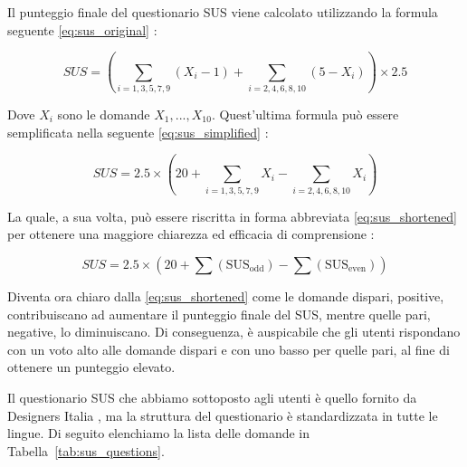 Il punteggio finale del questionario SUS viene calcolato utilizzando la formula seguente \eqref{eq:sus_original} \cite{SUS_DesignersItalia}:

\begin{equation}
    SUS = \left( \sum_{i=1,3,5,7,9} (X_i - 1) + \sum_{i=2,4,6,8,10} (5 - X_i) \right) \times 2.5
    \label{eq:sus_original}
\end{equation}

Dove \( X_i \) sono le domande \( X_1, ..., X_{10} \). Quest'ultima formula può essere semplificata nella seguente \eqref{eq:sus_simplified} \cite{SUS_Wikipedia}:

\begin{equation}
    SUS = 2.5 \times \left( 20 + \sum_{i=1,3,5,7,9} X_i - \sum_{i=2,4,6,8,10} X_i \right)
    \label{eq:sus_simplified}
\end{equation}

La quale, a sua volta, può essere riscritta in forma abbreviata \eqref{eq:sus_shortened} per ottenere una maggiore chiarezza ed efficacia di comprensione \cite{SUS_Wikipedia}:

\begin{equation}
    SUS = 2.5 \times \left( 20 + \sum (\text{SUS}_{\text{odd}}) - \sum (\text{SUS}_{\text{even}}) \right)
    \label{eq:sus_shortened}
\end{equation}

Diventa ora chiaro dalla \eqref{eq:sus_shortened} come le domande dispari, positive, contribuiscano ad aumentare il punteggio finale del SUS, mentre quelle pari, negative, lo diminuiscano. Di conseguenza, è auspicabile che gli utenti rispondano con un voto alto alle domande dispari e con uno basso per quelle pari, al fine di ottenere un punteggio elevato.

Il questionario SUS che abbiamo sottoposto agli utenti è quello fornito da Designers Italia \cite{SUS_DesignersItalia}, ma la struttura del questionario è standardizzata in tutte le lingue. Di seguito elenchiamo la lista delle domande in Tabella~\ref{tab:sus_questions}.

